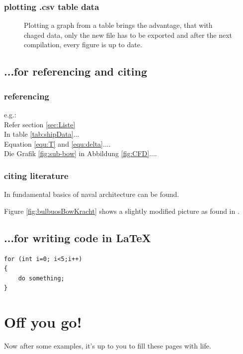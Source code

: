 \subsection{plotting .csv table data}
\begin{figure}[h!]
  \begin{center}
    \caption[Plot from .csv file]{Plotting a graph from a table brings the advantage, that with chaged data, only the new file has to be exported and after the next compilation, every figure is up to date.}\label{fig:tableplot}
  \end{center}
\end{figure}
\clearpage

\section{...for referencing and citing}
\subsection{referencing}
e.g.:\\
Refer section \ref{sec:Liste}\\
In table \ref{tab:shipData}...\\
Equation \ref{equ:T} and \ref{equ:delta}....\\
Die Grafik \ref{fig:sub-bow} in Abbildung \ref{fig:CFD}....

\subsection{citing literature}
In \cite{Schiffstechnik} fundamental basics of naval architecture can be found.

Figure \ref{fig:bulbuosBowKracht} shows a slightly modified picture as found in \cite{Kracht}.

\section{...for writing code in \LaTeX}


\begin{lstlisting}[caption={A simple code example}]
for (int i=0; i<5;i++)
{
    do something;
}
\end{lstlisting}

\chapter{Off you go!}

Now after some examples, it's up to you to fill these pages with life.  